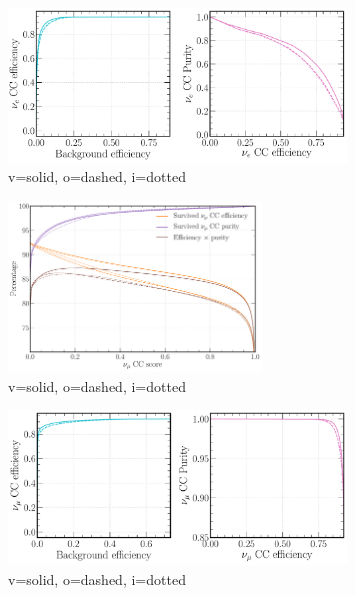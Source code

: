 \begin{figure} %
    \includegraphics[width=0.8\textwidth]{diagrams/7-cvn/chipsnet/repr_nuel_comp_curves.pdf}
    \caption[repr nuel comp curves short]
    {v=solid, o=dashed, i=dotted}
    \label{fig:repr_nuel_comp_curves}
\end{figure}

\begin{figure} %
    \includegraphics[width=0.6\textwidth]{diagrams/7-cvn/chipsnet/repr_numu_eff_curves.pdf}
    \caption[repr numu eff curves short]
    {v=solid, o=dashed, i=dotted}
    \label{fig:repr_numu_eff_curves}
\end{figure}

\begin{figure} %
    \includegraphics[width=0.8\textwidth]{diagrams/7-cvn/chipsnet/repr_numu_comp_curves.pdf}
    \caption[repr numu comp curves short]
    {v=solid, o=dashed, i=dotted}
    \label{fig:repr_numu_comp_curves}
\end{figure}

